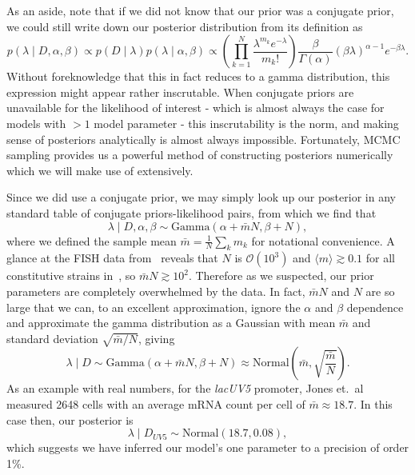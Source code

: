 \documentclass[12pt]{article}%
\begin{document}
As an aside, note that if we did not know that our prior was a
conjugate prior, we could still write down our posterior
distribution from its definition as
\begin{equation}
p(\lambda\mid D,\alpha,\beta)
\propto p(D\mid\lambda) p(\lambda \mid\alpha,\beta)
\propto \left(\prod_{k=1}^N \frac{\lambda^{m_k}e^{-\lambda}}{m_k!}\right)
        \frac{\beta}{\Gamma(\alpha)}(\beta\lambda)^{\alpha-1} e^{-\beta\lambda}
.
\end{equation}
Without foreknowledge that this in fact reduces to a gamma distribution,
this expression might appear rather inscrutable. When conjugate
priors are unavailable for the likelihood of interest - which is
almost always the case for models with $>1$ model parameter -
this inscrutability is the norm, and making sense of posteriors
analytically is almost always impossible. Fortunately, MCMC
sampling provides us a powerful method of constructing posteriors
numerically which we will make use of extensively.

Since we did use a conjugate prior, we may simply look up our
posterior in any standard table of conjugate priors-likelihood
pairs, from which we find that
\begin{equation}
\lambda\mid D,\alpha,\beta
\sim \text{Gamma}\left(\alpha + \bar{m}N, \beta + N\right),
\end{equation}
where we defined the sample mean $\bar{m} = \frac{1}{N}\sum_k m_k$
for notational convenience.
A glance at the FISH data from~\cite{Jones2014} reveals that $N$ is
$\mathcal{O}(10^3)$ and $\langle m\rangle \gtrsim 0.1$ for all
constitutive strains in~\cite{Jones2014}, so
$\bar{m}N \gtrsim 10^2$. Therefore as we suspected,
our prior parameters are completely overwhelmed by the data.
In fact, $\bar{m}N$ and $N$ are so large that we can,
to an excellent approximation, ignore the $\alpha$ and $\beta$ dependence and
approximate the gamma distribution as a Gaussian with mean $\bar{m}$ and
standard deviation $\sqrt{\bar{m}/N}$, giving
\begin{equation}
\lambda\mid D
\sim \text{Gamma}\left(\alpha + \bar{m}N, \beta + N\right)
\approx \text{Normal}\left(\bar{m}, \sqrt{\frac{\bar{m}}{N}}\right).
\end{equation}
As an example with real numbers, for the \textit{lacUV5} promoter,
Jones et.\ al~\cite{Jones2014} measured 2648 cells with an average
mRNA count per cell of $\bar{m} \approx 18.7$. In this case then,
our posterior is
\begin{equation}
\lambda\mid D_{UV5}
\sim \text{Normal}\left(18.7, 0.08\right),
\end{equation}
which suggests we have inferred our model's one parameter to a precision of order 1\%.
\end{document}
